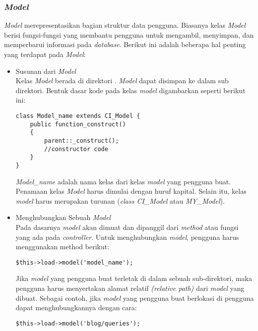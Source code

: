 	\subsubsection{\textit{Model}}
	\textit{Model} merepresentasikan bagian struktur data pengguna. Biasanya kelas \textit{Model} berisi fungsi-fungsi yang membantu pengguna untuk mengambil, menyimpan, dan memperbarui informasi pada \textit{database}. Berikut ini adalah beberapa hal penting yang terdapat pada \textit{Model}:
	\begin{itemize}
		\item Susunan dari \textit{Model} \\
		Kelas \textit{Model} berada di direktori . \textit{Model} dapat disimpan ke dalam sub direktori. Bentuk dasar kode pada kelas \textit{model} digambarkan seperti berikut ini:
		\begin{lstlisting}[basicstyle=\ttfamily, frame=single,
columns=fullflexible, keepspaces=true, breaklines=true]
class Model_name extends CI_Model {
	public function_construct()
	{
		parent::_construct();
		//constructor code
	}
}
\end{lstlisting}
		
		\textit{Model\_name} adalah nama kelas dari kelas \textit{model} yang pengguna buat. Penamaan kelas \textit{Model} harus dimulai dengan huruf kapital. Selain itu, kelas \textit{model} harus merupakan turunan (\textit{class CI\_Model} atau \textit{MY\_Model}).
		
		\item Menghubungkan Sebuah \textit{Model} \\
		Pada dasarnya \textit{model} akan dimuat dan dipanggil dari \textit{method} atau fungsi yang ada pada \textit{controller}. Untuk menghubungkan \textit{model}, pengguna harus menggunakan method berikut:
		\begin{lstlisting}[basicstyle=\ttfamily, frame=single,
columns=fullflexible, keepspaces=true, breaklines=true]
$this->load->model('model_name');
\end{lstlisting}
		
		Jika \textit{model} yang pengguna buat terletak di dalam sebuah sub-direktori, maka pengguna harus menyertakan alamat relatif \textit{(relative path)} dari \textit{model} yang dibuat. Sebagai contoh, jika \textit{model} yang pengguna buat berlokasi di  pengguna dapat menghubungkannya dengan cara:
		\begin{lstlisting}[basicstyle=\ttfamily, frame=single,
columns=fullflexible, keepspaces=true, breaklines=true]
$this->load->model('blog/queries');
\end{lstlisting}
		

\end{itemize}
